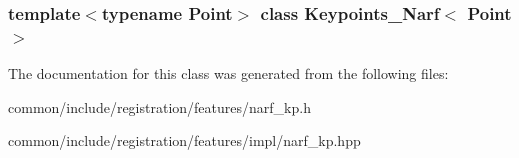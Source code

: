 \subsubsection*{template$<$typename Point$>$ class Keypoints\_\-Narf$<$ Point $>$}



The documentation for this class was generated from the following files:\begin{DoxyCompactItemize}
\item 
common/include/registration/features/narf\_\-kp.h\item 
common/include/registration/features/impl/narf\_\-kp.hpp\end{DoxyCompactItemize}
